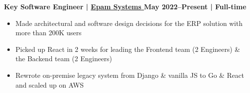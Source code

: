 \textbf{Key Software Engineer | 
\href{https://www.epam.com/}{
    {Epam Systems} 
} \hfill May 2022--Present | Full-time}

\par
\begin{itemize}[label=$\bullet$]
    \item Made architectural and software design decisions for the ERP solution with more than 200K users
    \item Picked up React in 2 weeks for leading the Frontend team (2 Engineers) \& the Backend team (2 Engineers)
    \item Rewrote on-premise legacy system from Django \& vanilla JS to Go \& React and scaled up on AWS 
    \newline
\end{itemize}
\par